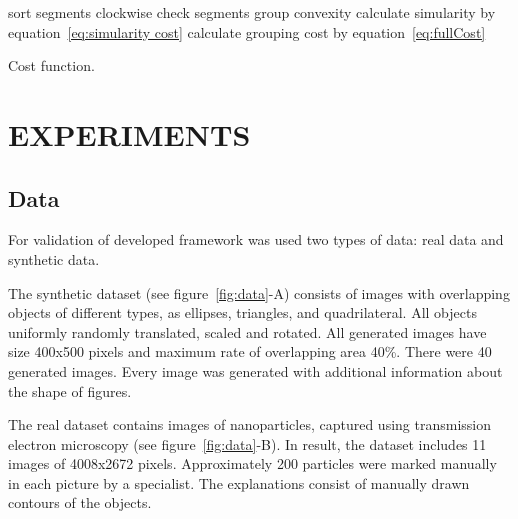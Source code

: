 \documentclass{lutmscthesis}[2010/09/22]
\begin{document}
\begin{algorithm} [H]
    \SetAlgoLined
     {
     \Return {$\infty$ }
    }
    sort segments clockwise\;
    check segments group convexity\;
     {
        \Return {$\infty$ }
    }
    calculate simularity by equation~\ref{eq:simularity cost}\;
    calculate grouping cost by equation~\ref{eq:fullCost}\;
\caption{Cost function.}\label{alg:CostFunction}
\end{algorithm}

\section{EXPERIMENTS}
\label{sec:experiments}

\subsection{Data}
For validation of developed framework was used two types of data: real data and synthetic data.
 
The synthetic dataset (see figure~\ref{fig:data}-A) consists of images with overlapping
objects of different types, as ellipses, triangles, and quadrilateral. All objects uniformly randomly translated, scaled and rotated. All generated images have size 400x500 pixels and maximum rate of overlapping area 40\%. There were 40 generated images. Every image was generated with additional information about the shape of figures.

The real dataset contains images of nanoparticles, captured
using transmission electron microscopy (see figure~\ref{fig:data}-B). In result, the dataset includes 11 images of 4008x2672 pixels. Approximately 200 particles were marked manually in each picture by a specialist. The explanations consist of manually drawn contours of the objects. 

\begin{figure}[htp]
\end{figure}
\end{document}

